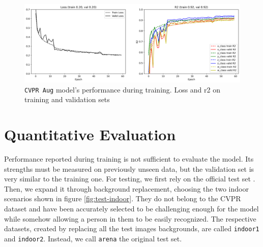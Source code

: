\begin{figure}[H]
	\centering
	\includegraphics[width=1 \textwidth]{"contents/images/06-training-CVPRaug"}
	\caption[\texttt{CVPR Aug} model's performance during training. Loss and \gls{r2} on training and validation sets]{\texttt{CVPR Aug} model's performance during training. Loss and \gls{r2} on training and validation sets}
	\label{fig:training-metrics-cvpraug}
\end{figure}




\section{Quantitative Evaluation}
\label{sec:evaluation-quantitative}

Performance reported during training is not sufficient to evaluate the model. Its strengths must be measured on previously unseen data, but the validation set is very similar to the training one. For testing, we first rely on the official test set \cite{mantegazza2019visionbased}. Then, we expand it through background replacement, choosing the two indoor scenarios shown in figure \ref{fig:test-indoor}. They do not belong to the CVPR dataset and have been accurately selected to be challenging enough for the model while somehow allowing a person in them to be easily recognized. The respective datasets, created by replacing all the test images backgrounds, are called \texttt{indoor1} and \texttt{indoor2}. Instead, we call \texttt{arena} the original test set.

